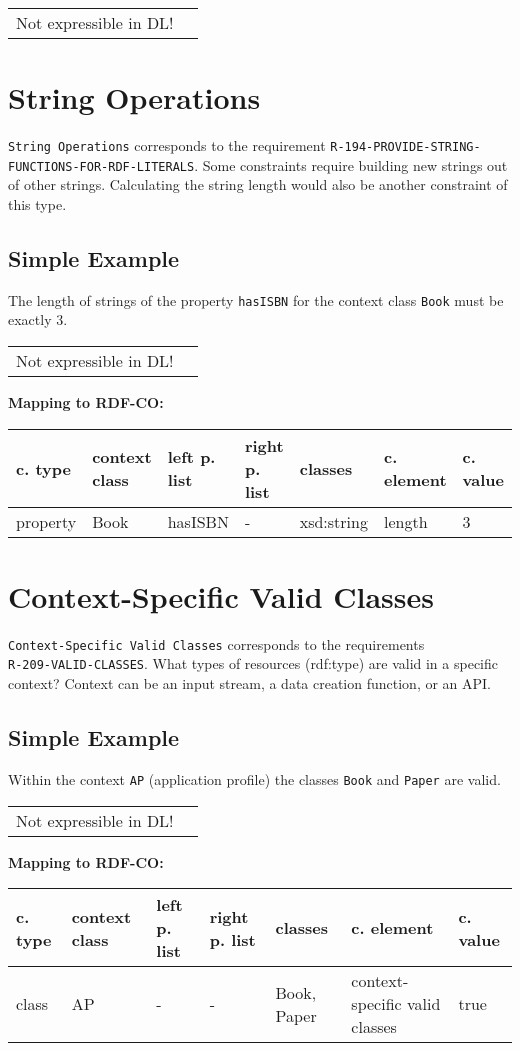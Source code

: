 \documentclass{llncs}
\newcommand{\ms}[1]{\texttt{#1}}
\newenvironment{gcotable}{
  \scriptsize
  \sffamily
  \vspace{0cm}
	\begin{center}
	\textbf{\vspace{0.4cm}Mapping to RDF-CO:} \\
  \begin{tabular}{l|l|l|l|l|l|l}
	\hline
  \textbf{c. type} & \textbf{context class} & \textbf{left p. list} & \textbf{right p. list} & \textbf{classes} & \textbf{c. element} & \textbf{c. value} \\
  \hline

}{
  \hline
  \end{tabular}
	\end{center}
}
\newenvironment{DL}{
  \vspace{0cm}
	\begin{center}
  \begin{tabular}{r l}

}{
  \end{tabular}
	\end{center}
}
\begin{document}
\begin{DL}
Not expressible in DL!
\end{DL}

\section{String Operations}

\ms{String Operations} corresponds to the requirement
\ms{R-194-PROVIDE-STRING-} \ms{FUNCTIONS-FOR-RDF-LITERALS}.
Some constraints require building new strings out of other strings.
Calculating the string length would also be another constraint of this type.

\subsection{Simple Example}

The length of strings of the property \ms{hasISBN} for the context class \ms{Book} must be exactly 3.

\begin{DL}
Not expressible in DL!
\end{DL}

\begin{gcotable}
property & Book & hasISBN & - & xsd:string & length & 3 \\
\end{gcotable}

\section{Context-Specific Valid Classes}


\ms{Context-Specific Valid Classes} corresponds to the requirements \\
\ms{R-209-VALID-CLASSES}.
What types of resources (rdf:type) are valid in a specific context? 
Context can be an input stream, a data creation function, or an API.

\subsection{Simple Example}

Within the context \ms{AP} (application profile) the classes \ms{Book} and \ms{Paper} are valid.

\begin{DL}
Not expressible in DL!
\end{DL}

\begin{gcotable}
class & AP & - & - & Book, Paper & context-specific valid classes & true \\
\end{gcotable}
\end{document}
